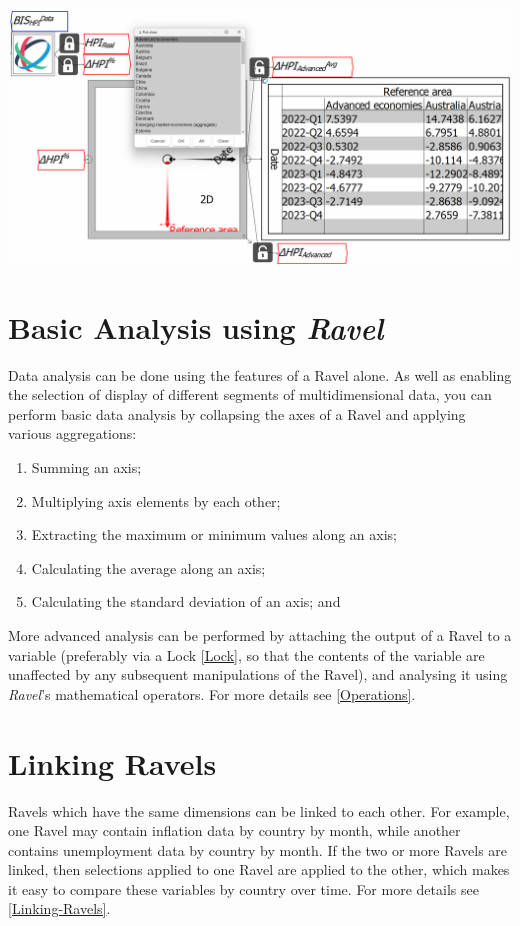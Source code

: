 \noindent\includegraphics[width=\textwidth]{images/tut07SeparatingAdvancedAverage}

\section{Basic Analysis using \emph{Ravel}}

Data analysis can be done using the features of a Ravel alone. As
well as enabling the selection of display of different segments of
multidimensional data, you can perform basic data analysis by collapsing
the axes of a Ravel and applying various aggregations:
\begin{enumerate}
\item Summing an axis;
\item Multiplying axis elements by each other;
\item Extracting the maximum or minimum values along an axis; 
\item Calculating the average along an axis;
\item Calculating the standard deviation of an axis; and
\end{enumerate}
More advanced analysis can be performed by attaching the output of
a Ravel to a variable (preferably via a Lock \ref{Lock}, so that
the contents of the variable are unaffected by any subsequent manipulations
of the Ravel), and analysing it using \emph{Ravel}'s mathematical
operators. For more details see \ref{Operations}.

\section{Linking Ravels}

Ravels which have the same dimensions can be linked to each other.
For example, one Ravel may contain inflation data by country by month,
while another contains unemployment data by country by month. If the
two or more Ravels are linked, then selections applied to one Ravel
are applied to the other, which makes it easy to compare these variables
by country over time. For more details see \ref{Linking-Ravels}.

